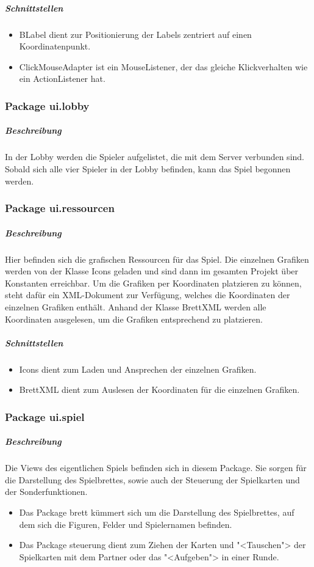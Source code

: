 \documentclass[12pt,halfparskip]{scrartcl}
\begin{document}
\subparagraph{Schnittstellen}
\begin{itemize}
	\item BLabel dient zur Positionierung der Labels zentriert auf einen Koordinatenpunkt.
	\item ClickMouseAdapter ist ein MouseListener, der das gleiche Klickverhalten wie ein ActionListener hat.
\end{itemize}

\subsubsection{Package ui.lobby}
\label{ssub:package_ui_lobby}
\subparagraph{Beschreibung}
In der Lobby werden die Spieler aufgelistet, die mit dem Server verbunden sind. Sobald sich alle vier Spieler in der Lobby befinden, kann das Spiel begonnen werden.

\subsubsection{Package ui.ressourcen}
\label{ssub:package_ui_ressourcen}
\subparagraph{Beschreibung}
Hier befinden sich die grafischen Ressourcen für das Spiel. Die einzelnen Grafiken werden von der Klasse Icons geladen und sind dann im gesamten Projekt über Konstanten erreichbar. Um die Grafiken per Koordinaten platzieren zu können, steht dafür ein XML-Dokument zur Verfügung, welches die Koordinaten der einzelnen Grafiken enthält. Anhand der Klasse BrettXML werden alle Koordinaten ausgelesen, um die Grafiken entsprechend zu platzieren.

\subparagraph{Schnittstellen}
\begin{itemize}
	\item Icons dient zum Laden und Ansprechen der einzelnen Grafiken.
	\item BrettXML dient zum Auslesen der Koordinaten für die einzelnen Grafiken.
\end{itemize}

\subsubsection{Package ui.spiel}
\label{ssub:package_ui_spiel}
\subparagraph{Beschreibung}
Die Views des eigentlichen Spiels befinden sich in diesem Package. Sie sorgen für die Darstellung des Spielbrettes, sowie auch der Steuerung der Spielkarten und der Sonderfunktionen.

\begin{itemize}
	\item Das Package brett kümmert sich um die Darstellung des Spielbrettes, auf dem sich die Figuren, Felder und Spielernamen befinden.
	\item Das Package steuerung dient zum Ziehen der Karten und "<Tauschen"> der Spielkarten mit dem Partner oder das "<Aufgeben"> in einer Runde.
\end{itemize}
\end{document}
